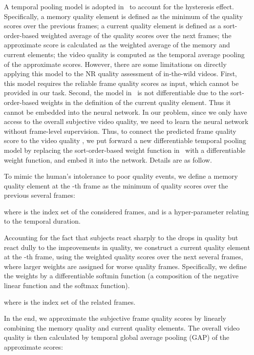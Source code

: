 \documentclass[sigconf]{acmart}
\begin{document}
A temporal pooling model is adopted in~\cite{seshadrinathan2011temporal} to account for the hysteresis effect. 
Specifically, a memory quality element is defined as the minimum of the quality scores over the previous frames; a current quality element is defined as a sort-order-based weighted average of the quality scores over the next frames; the approximate score is calculated as the weighted average of the memory and current elements; the video quality is computed as the temporal average pooling of the approximate scores. 
However, there are some limitations on directly applying this model to the NR quality assessment of in-the-wild videos. 
First, this model requires the reliable frame quality scores as input, which cannot be provided in our task. 
Second, the model in~\cite{seshadrinathan2011temporal} is not differentiable due to the sort-order-based weights in the definition of the current quality element. Thus it cannot be embedded into the neural network. 
In our problem, since we only have access to the overall subjective video quality, we need to learn the neural network without frame-level supervision. 
Thus, to connect the predicted frame quality score  to the video quality , we put forward a new differentiable temporal pooling model by replacing the sort-order-based weight function in~\cite{seshadrinathan2011temporal} with a differentiable weight function, and embed it into the network. 
Details are as follow.

To mimic the human's intolerance to poor quality events, we define a memory quality element  at the -th frame as the minimum of quality scores over the previous several frames:

where  is the index set of the considered frames, and  is a hyper-parameter relating to the temporal duration.

Accounting for the fact that subjects react sharply to the drops in quality but react dully to the improvements in quality, we construct a current quality element  at the -th frame, using the weighted quality scores over the next several frames, where larger weights are assigned for worse quality frames. Specifically, we define the weights  by a differentiable softmin function (a composition of the negative linear function and the softmax function).

where  is the index set of the related frames.

In the end, we approximate the subjective frame quality scores by linearly combining the memory quality and current quality elements. The overall video quality  is then calculated by temporal global average pooling (GAP) of the approximate scores:
\end{document}

